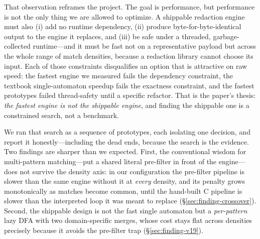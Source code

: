 \documentclass[acmsmall,nonacm,screen]{acmart}
\begin{document}
That observation reframes the project. The goal is performance, but performance is
not the only thing we are allowed to optimize. A shippable redaction engine must
also (i) add no runtime dependency, (ii) produce byte-for-byte-identical output to
the engine it replaces, and (iii) be safe under a threaded, garbage-collected
runtime---and it must be fast not on a representative payload but across the whole
range of match densities, because a redaction library cannot choose its input. Each
of those constraints disqualifies an option that is attractive on raw speed: the
fastest engine we measured fails the dependency constraint, the textbook
single-automaton speedup fails the exactness constraint, and the fastest prototypes
failed thread-safety until a specific refactor. That is the paper's thesis:
\emph{the fastest engine is not the shippable engine}, and finding the shippable one
is a constrained search, not a benchmark.

We ran that search as a sequence of prototypes, each isolating one decision, and
report it honestly---including the dead ends, because the search is the evidence.
Two findings are sharper than we expected. First, the conventional wisdom for
multi-pattern matching---put a shared literal pre-filter in front of the
engine---does not survive the density axis: in our configuration the pre-filter
pipeline is slower than the same engine without it at \emph{every} density, and its
penalty grows monotonically as matches become common, until the hand-built C
pipeline is slower than the interpreted loop it was meant to replace
(\S\ref{sec:finding-crossover}). Second, the shippable design is not the fast
single automaton but a \emph{per-pattern} lazy DFA with two domain-specific merges,
whose cost stays flat across densities precisely because it avoids the pre-filter
trap (\S\ref{sec:finding-v19}).
\end{document}
